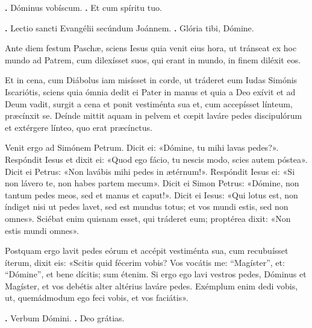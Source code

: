 
\textbf{\Vbar.} Dóminus vobíscum.
\textbf{\Rbar.} Et cum spíritu tuo.

\textbf{\Vbar.} Lectio sancti Evangélii secúndum Joánnem.
\textbf{\Rbar.} Glória tibi, Dómine.

Ante diem festum Paschæ, sciens Iesus quia venit eius hora, ut tránseat ex hoc mundo ad Patrem, cum dilexísset suos, qui erant in mundo, in finem diléxit eos.

Et in cena, cum Diábolus iam misísset in corde, ut tráderet eum Iudas Simónis Iscariótis, sciens quia ómnia dedit ei Pater in manus et quia a Deo exívit et ad Deum vadit, surgit a cena et ponit vestiménta sua et, cum accepísset línteum, præcínxit se. Deínde mittit aquam in pelvem et cœpit laváre pedes discipulórum et extérgere línteo, quo erat præcínctus. 

Venit ergo ad Simónem Petrum. Dicit ei: «Dómine, tu mihi lavas pedes?».
Respóndit Iesus et dixit ei: «Quod ego fácio, tu nescis modo, scies autem póstea». 
Dicit ei Petrus: «Non lavábis mihi pedes in ætérnum!». 
Respóndit Iesus ei: «Si non lávero te, non habes partem mecum». 
Dicit ei Simon Petrus: «Dómine, non tantum pedes meos, sed et manus et caput!».
Dicit ei Iesus: «Qui lotus est, non índiget nisi ut pedes lavet, sed est mundus totus; et vos mundi estis, sed non omnes».
Sciébat enim quisnam esset, qui tráderet eum; proptérea dixit:
«Non estis mundi omnes». 

Postquam ergo lavit pedes eórum et accépit vestiménta sua, cum recubuísset íterum, dixit eis: «Scitis quid fécerim vobis? 
Vos vocátis me: “Magíster”, et: “Dómine”, et bene dícitis; sum étenim.
Si ergo ego lavi vestros pedes, Dóminus et Magíster, et vos debétis alter altérius laváre pedes.
Exémplum enim dedi vobis, ut, quemádmodum ego feci vobis, et vos faciátis».

\textbf{\Vbar.} Verbum Dómini.
\textbf{\Rbar.} Deo grátias.
\par